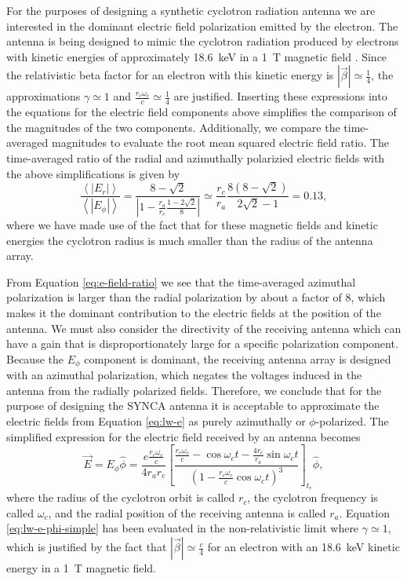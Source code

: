 For the purposes of designing a synthetic cyclotron radiation antenna we are interested in the dominant electric field polarization emitted by the electron. The antenna is being designed to mimic the cyclotron radiation produced by electrons with kinetic energies of approximately 18.6~keV in a 1~T magnetic field \cite{Bodine:2015sma}. Since the relativistic beta factor for an electron with this kinetic energy is  $|\vec{\beta}|\simeq\frac{1}{4}$, the approximations $\gamma\simeq1$ and $\frac{r_c\omega_c}{c}\simeq\frac{1}{4}$ are justified. Inserting these expressions into the equations for the electric field components above simplifies the comparison of the magnitudes of the two components. Additionally, we compare the time-averaged magnitudes to evaluate the root mean squared electric field ratio. The time-averaged ratio of the radial and azimuthally polarizied electric fields with the above simplifications is given by
\begin{equation}
    \label{eq:e-field-ratio}
    \frac{\left<|E_r|\right>}{\left<|E_\phi|\right>}=\frac{8-\sqrt{2}}{\left|1-\frac{r_{a}}{r_c}\frac{1-2\sqrt{2}}{8}\right|}\simeq\frac{r_c}{r_{a}}\frac{8(8-\sqrt{2})}{2\sqrt{2}-1}=0.13,
\end{equation}
where we have made use of the fact that for these magnetic fields and kinetic energies the cyclotron radius is much smaller than the radius of the antenna array.

From Equation \ref{eq:e-field-ratio} we see that the time-averaged azimuthal polarization is larger than the radial polarization by about a factor of 8, which makes it the dominant contribution to the electric fields at the position of the antenna. We must also consider the directivity of the receiving antenna which can have a gain that is disproportionately large for a specific polarization component. Because the $E_\phi$ component is dominant, the receiving antenna array is designed with an azimuthal polarization, which negates the voltages induced in the antenna from the radially polarized fields. Therefore, we conclude that for the purpose of designing the SYNCA antenna it is acceptable to approximate the electric fields from Equation \ref{eq:lw-e} as purely azimuthally or $\phi$-polarized. The simplified expression for the electric field received by an antenna becomes
\begin{equation}
    \label{eq:lw-e-phi-simple}
    \vec{E}=E_\phi\hat{\phi} = \frac{e\frac{r_c\omega_c}{c}}{4r_{a}r_c}\left[\frac{\frac{r_c\omega_c}{c}-\cos{\omega_ct}-\frac{4r_c}{ r_{a}}\sin{\omega_ct}}{(1-\frac{r_c\omega_c}{c}\cos{\omega_ct})^3}\right]_{t_r}\hat{\phi},
\end{equation}
where the radius of the cyclotron orbit is called $r_c$, the cyclotron frequency is called $\omega_c$, and the radial position of the receiving antenna is called $r_a$. Equation \ref{eq:lw-e-phi-simple} has been evaluated in the non-relativistic limit where $\gamma\simeq1$, which is justified by the fact that $|\vec{\beta}|\simeq\frac{c}{4}$ for an electron with an 18.6~keV kinetic energy in a 1~T magnetic field.

